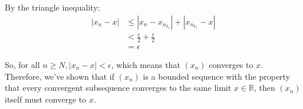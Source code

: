 \documentclass{report}
\begin{document}
By the triangle inequality:
$$
\begin{aligned}
\left|x_n-x\right| & \leq\left|x_n-x_{n_{k_1}}\right|+\left|x_{n_{k_1}}-x\right| \\
& <\frac{\epsilon}{2}+\frac{\epsilon}{2} \\
& =\epsilon
\end{aligned}
$$

So, for all $n \geq N,\left|x_n-x\right|<\epsilon$, which means that $\left(x_n\right)$ converges to $x$.
Therefore, we've shown that if $\left(x_n\right)$ is a bounded sequence with the property that every convergent subsequence converges to the same limit $x \in \mathbb{R}$, then $\left(x_n\right)$ itself must converge to $x$.
\end{document}
